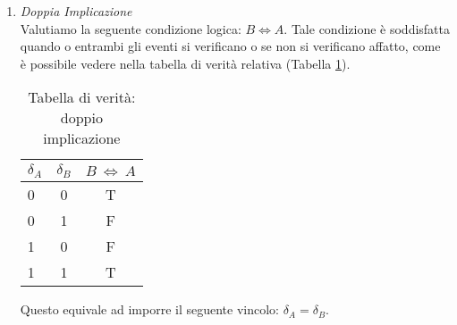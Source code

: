 \begin{enumerate}
\item \textit{Doppia Implicazione}\\
Valutiamo la seguente condizione logica: $B \Longleftrightarrow A$.
Tale condizione è soddisfatta quando o entrambi gli eventi si verificano o se non si verificano affatto, come è possibile vedere nella tabella di verità relativa (Tabella \ref{tab:tableDoppiaImp}).

\begin{table}[h!]
  \begin{center}
    \begin{tabular}{l|c|c} %
      $\delta_A$ & $\delta_B$ & $B~\Longleftrightarrow~A$ \\
      \hline
      0 & 0 & T\\
      0 & 1 & F\\
      1 & 0 & F\\
      1 & 1 & T\\
    \end{tabular}
    \caption{Tabella di verità: doppio implicazione}
    \label{tab:tableDoppiaImp}
  \end{center}
\end{table}

Questo equivale ad imporre il seguente vincolo: $\delta_A = \delta_B$.
\end{enumerate}

%

